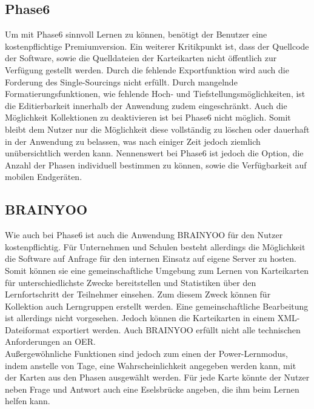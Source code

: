 \subsection{Phase6}
Um mit Phase6 \cite{phase6} sinnvoll Lernen zu können, benötigt der Benutzer eine kostenpflichtige Premiumversion. Ein weiterer Kritikpunkt ist, dass der Quellcode der Software, sowie die Quelldateien der Karteikarten nicht öffentlich zur Verfügung gestellt werden. Durch die fehlende Exportfunktion wird auch die Forderung des Single-Sourcings nicht erfüllt. Durch mangelnde Formatierungsfunktionen, wie fehlende Hoch- und Tiefstellungsmöglichkeiten, ist die Editierbarkeit innerhalb der Anwendung zudem eingeschränkt.
Auch die Möglichkeit Kollektionen zu deaktivieren ist bei Phase6 nicht möglich. Somit bleibt dem Nutzer nur die Möglichkeit diese vollständig zu löschen oder dauerhaft in der Anwendung zu belassen, was nach einiger Zeit jedoch ziemlich unübersichtlich werden kann. Nennenswert bei Phase6 ist jedoch die Option, die Anzahl der Phasen individuell bestimmen zu können, sowie die Verfügbarkeit auf mobilen Endgeräten.\\


\subsection{BRAINYOO}
Wie auch bei Phase6 ist auch die Anwendung BRAINYOO \cite{brainyoo} für den Nutzer kostenpflichtig. Für Unternehmen und Schulen besteht allerdings die Möglichkeit die Software auf Anfrage für den internen Einsatz auf eigene Server zu hosten. Somit können sie eine gemeinschaftliche Umgebung zum Lernen von Karteikarten für unterschiedlichste Zwecke bereitstellen und Statistiken über den Lernfortschritt der Teilnehmer einsehen. Zum diesem Zweck können für Kollektion auch Lerngruppen erstellt werden. Eine gemeinschaftliche Bearbeitung ist allerdings nicht vorgesehen. Jedoch können die Karteikarten in einem XML-Dateiformat exportiert werden. Auch BRAINYOO erfüllt nicht alle technischen Anforderungen an OER. \\

\noindent Außergewöhnliche Funktionen sind jedoch zum einen der Power-Lernmodus, indem anstelle von Tage, eine Wahrscheinlichkeit angegeben werden kann, mit der Karten aus den Phasen ausgewählt werden. Für jede Karte könnte der Nutzer neben Frage und Antwort auch eine Eselsbrücke angeben, die ihm beim Lernen helfen kann.

